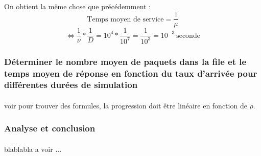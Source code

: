                 \paragraph{}
On obtient la même chose que précédemment :
\[  \text{Temps moyen de service} = \frac{1}{\mu} \]
\[ \iff \frac{1}{\nu} * \frac{1}{D} = 10^{4} * \frac{1}{10^{7}} = \frac{1}{10^{3}} = 10^{-3} \ \text{seconde} \]
%
            \subsubsection{Déterminer le nombre moyen de paquets dans la file et le temps moyen de réponse en fonction du taux d'arrivée pour différentes durées de simulation}
%
                \paragraph{}
voir pour trouver des formules, la progression doit être linéaire en fonction de $\rho$.
%
            \subsubsection{Analyse et conclusion}
%
                \paragraph{}
blablabla a voir ...
%
    \clearpage
%
